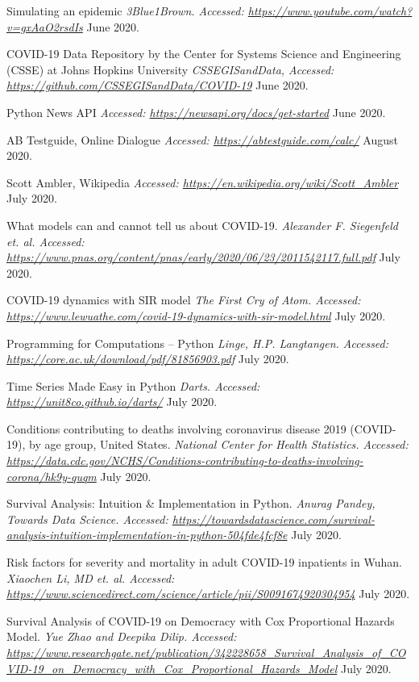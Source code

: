 \begin{thebibliography}{1}
 Simulating an epidemic {\em 3Blue1Brown. Accessed:  \url{https://www.youtube.com/watch?v=gxAaO2rsdIs}} June 2020.

 COVID-19 Data Repository by the Center for Systems Science and Engineering (CSSE) at Johns Hopkins University {\em CSSEGISandData, Accessed:  \url{https://github.com/CSSEGISandData/COVID-19}} June 2020.

 Python News API {\em Accessed:  \url{https://newsapi.org/docs/get-started}} June 2020.

 AB Testguide, Online Dialogue {\em Accessed:  \url{https://abtestguide.com/calc/}} August 2020.

 Scott Ambler, Wikipedia {\em Accessed:  \url{https://en.wikipedia.org/wiki/Scott_Ambler}} July 2020.

 What models can and cannot tell us about COVID-19. {\em Alexander F. Siegenfeld et. al. Accessed:  \url{https://www.pnas.org/content/pnas/early/2020/06/23/2011542117.full.pdf}} July 2020.

 COVID-19 dynamics with SIR model {\em The First Cry of Atom. Accessed:  \url{https://www.lewuathe.com/covid-19-dynamics-with-sir-model.html}} July 2020.

 Programming for Computations – Python {\em Linge, H.P. Langtangen. Accessed:  \url{https://core.ac.uk/download/pdf/81856903.pdf}} July 2020.

 Time Series Made Easy in Python {\em Darts. Accessed:  \url{https://unit8co.github.io/darts/}} July 2020.

 Conditions contributing to deaths involving coronavirus disease 2019 (COVID-19), by age group, United States. {\em 	National Center for Health Statistics. Accessed:  \url{https://data.cdc.gov/NCHS/Conditions-contributing-to-deaths-involving-corona/hk9y-quqm}} July 2020.

 Survival Analysis: Intuition & Implementation in Python. {\em 	Anurag Pandey, Towards Data Science. Accessed:  \url{https://towardsdatascience.com/survival-analysis-intuition-implementation-in-python-504fde4fcf8e}} July 2020.

 Risk factors for severity and mortality in adult COVID-19 inpatients in Wuhan. {\em Xiaochen Li, MD et. al. Accessed:  \url{https://www.sciencedirect.com/science/article/pii/S0091674920304954}} July 2020.

 Survival Analysis of COVID-19 on Democracy with Cox Proportional Hazards Model. {\em 	Yue Zhao and Deepika Dilip. Accessed:  \url{https://www.researchgate.net/publication/342228658_Survival_Analysis_of_COVID-19_on_Democracy_with_Cox_Proportional_Hazards_Model}} July 2020.


\end{thebibliography}
